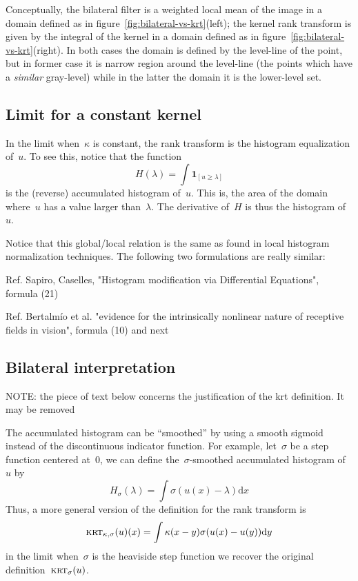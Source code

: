 \documentclass[12pt]{article}                  %
\begin{document}
Conceptually, the bilateral filter is a weighted local mean of the image in a
domain defined as in figure~\ref{fig:bilateral-vs-krt}(left); the kernel rank
transform is given by the integral of the kernel in a domain defined as in
figure~\ref{fig:bilateral-vs-krt}(right).  In both cases the domain is defined
by the level-line of the point, but in former case it is narrow region around
the level-line (the points which have a \emph{similar} gray-level) while in the
latter the domain it is the lower-level set.


\subsection{Limit for a constant kernel}

In the limit when~$\kappa$ is constant, the rank transform is the histogram
equalization of~$u$.  To see this, notice that the function
\[
H(\lambda) = \int\mathbf{1}_{[u\ge\lambda]}
\]
is the (reverse) accumulated histogram of~$u$.  This is, the area of the domain
where~$u$ has a value larger than~$\lambda$.  The derivative of~$H$ is thus the
histogram of~$u$.

Notice that this global/local relation is the same as found in local
histogram normalization techniques.
The following two formulations are really similar:

Ref. Sapiro, Caselles,  "Histogram modification via Differential Equations",
formula (21)~\cite{sapiro1997histogram}

Ref. Bertalmío et al. "evidence for the intrinsically nonlinear nature of
receptive fields in vision", formula (10) and next~\cite{bertalmio2020evidence}


\subsection{Bilateral interpretation}

NOTE: the piece of text below concerns the justification of the krt
definition.  It may be removed 

The accumulated histogram can be ``smoothed'' by using a smooth sigmoid instead
of the discontinuous indicator function.  For example, let~$\sigma$ be a step
function centered at~$0$, we can define the~$\sigma$-smoothed accumulated
histogram of~$u$ by
\[
H_\sigma(\lambda)=\int\sigma(u(x)-\lambda)\mathrm{d}x
\]
Thus, a more general version of the definition for the rank transform is
\begin{equation}\label{eq:generalrank}
	\textsc{krt}_{\kappa,\sigma}(u)(x)=\int \kappa(x-y)\sigma(u(x)-u(y))\mathrm{d}y
\end{equation}
in the limit when~$\sigma$ is the heaviside step function we recover the
original definition~$\textsc{krt}_\sigma(u)$.
\end{document}
